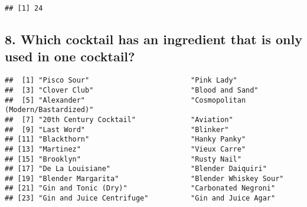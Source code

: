 \documentclass[
]{article}
\newenvironment{Shaded}{\begin{snugshade}}{\end{snugshade}}
\newcommand{\DataTypeTok}[1]{\textcolor[rgb]{0.13,0.29,0.53}{#1}}
\newcommand{\KeywordTok}[1]{\textcolor[rgb]{0.13,0.29,0.53}{\textbf{#1}}}
\newcommand{\NormalTok}[1]{#1}
\newcommand{\OperatorTok}[1]{\textcolor[rgb]{0.81,0.36,0.00}{\textbf{#1}}}
\newcommand{\StringTok}[1]{\textcolor[rgb]{0.31,0.60,0.02}{#1}}
\begin{document}
\begin{Shaded}
\end{Shaded}

\begin{verbatim}
## [1] 24
\end{verbatim}

\hypertarget{which-cocktail-has-an-ingredient-that-is-only-used-in-one-cocktail}{%
\subsection{8. Which cocktail has an ingredient that is only used in one
cocktail?}\label{which-cocktail-has-an-ingredient-that-is-only-used-in-one-cocktail}}

\begin{Shaded}
\end{Shaded}

\begin{verbatim}
##  [1] "Pisco Sour"                        "Pink Lady"                        
##  [3] "Clover Club"                       "Blood and Sand"                   
##  [5] "Alexander"                         "Cosmopolitan (Modern/Bastardized)"
##  [7] "20th Century Cocktail"             "Aviation"                         
##  [9] "Last Word"                         "Blinker"                          
## [11] "Blackthorn"                        "Hanky Panky"                      
## [13] "Martinez"                          "Vieux Carre"                      
## [15] "Brooklyn"                          "Rusty Nail"                       
## [17] "De La Louisiane"                   "Blender Daiquiri"                 
## [19] "Blender Margarita"                 "Blender Whiskey Sour"             
## [21] "Gin and Tonic (Dry)"               "Carbonated Negroni"               
## [23] "Gin and Juice Centrifuge"          "Gin and Juice Agar"
\end{verbatim}
\end{document}
